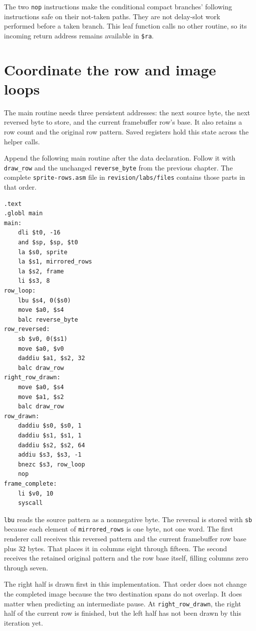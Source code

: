 The two \texttt{nop} instructions make the conditional compact branches' following
instructions safe on their not-taken paths. They are not delay-slot work performed
before a taken branch. This leaf function calls no other routine, so its incoming
return address remains available in \texttt{\$ra}.

\section{Coordinate the row and image loops}

The main routine needs three persistent addresses: the next source byte, the next
reversed byte to store, and the current framebuffer row's base. It also retains
a row count and the original row pattern. Saved registers hold this state across
the helper calls.

Append the following main routine after the data declaration. Follow it with
\texttt{draw\_row} and the unchanged \texttt{reverse\_byte} from the previous
chapter. The complete \texttt{sprite-rows.asm} file in
\texttt{revision/labs/files} contains those parts in that order.

\begin{verbatim}
.text
.globl main
main:
    dli $t0, -16
    and $sp, $sp, $t0
    la $s0, sprite
    la $s1, mirrored_rows
    la $s2, frame
    li $s3, 8
row_loop:
    lbu $s4, 0($s0)
    move $a0, $s4
    balc reverse_byte
row_reversed:
    sb $v0, 0($s1)
    move $a0, $v0
    daddiu $a1, $s2, 32
    balc draw_row
right_row_drawn:
    move $a0, $s4
    move $a1, $s2
    balc draw_row
row_drawn:
    daddiu $s0, $s0, 1
    daddiu $s1, $s1, 1
    daddiu $s2, $s2, 64
    addiu $s3, $s3, -1
    bnezc $s3, row_loop
    nop
frame_complete:
    li $v0, 10
    syscall
\end{verbatim}

\texttt{lbu} reads the source pattern as a nonnegative byte. The reversal is
stored with \texttt{sb} because each element of \texttt{mirrored\_rows} is one
byte, not one word. The first renderer call receives this reversed pattern and
the current framebuffer row base plus 32 bytes. That places it in columns eight
through fifteen. The second receives the retained original pattern and the row
base itself, filling columns zero through seven.

The right half is drawn first in this implementation. That order does not change
the completed image because the two destination spans do not overlap. It does
matter when predicting an intermediate pause. At \texttt{right\_row\_drawn}, the
right half of the current row is finished, but the left half has not been drawn
by this iteration yet.

